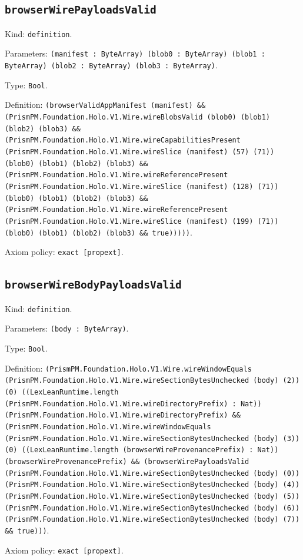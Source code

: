 \documentclass[11pt]{article}
\begin{document}
\subsection*{\texttt{browserWirePayloadsValid}}
\noindent Kind: \texttt{definition}.\par
\noindent Parameters: \texttt{(manifest : ByteArray) (blob0 : ByteArray) (blob1 : ByteArray) (blob2 : ByteArray) (blob3 : ByteArray)}.\par
\noindent Type: \texttt{Bool}.\par
\noindent Definition: \texttt{(browserValidAppManifest (manifest) \&\& (PrismPM.Foundation.Holo.V1.Wire.wireBlobsValid (blob0) (blob1) (blob2) (blob3) \&\& (PrismPM.Foundation.Holo.V1.Wire.wireCapabilitiesPresent (PrismPM.Foundation.Holo.V1.Wire.wireSlice (manifest) (57) (71)) (blob0) (blob1) (blob2) (blob3) \&\& (PrismPM.Foundation.Holo.V1.Wire.wireReferencePresent (PrismPM.Foundation.Holo.V1.Wire.wireSlice (manifest) (128) (71)) (blob0) (blob1) (blob2) (blob3) \&\& (PrismPM.Foundation.Holo.V1.Wire.wireReferencePresent (PrismPM.Foundation.Holo.V1.Wire.wireSlice (manifest) (199) (71)) (blob0) (blob1) (blob2) (blob3) \&\& true)))))}.\par
\noindent Axiom policy: \texttt{exact [propext]}.\par
\subsection*{\texttt{browserWireBodyPayloadsValid}}
\noindent Kind: \texttt{definition}.\par
\noindent Parameters: \texttt{(body : ByteArray)}.\par
\noindent Type: \texttt{Bool}.\par
\noindent Definition: \texttt{(PrismPM.Foundation.Holo.V1.Wire.wireWindowEquals (PrismPM.Foundation.Holo.V1.Wire.wireSectionBytesUnchecked (body) (2)) (0) ((LexLeanRuntime.length (PrismPM.Foundation.Holo.V1.Wire.wireDirectoryPrefix) : Nat)) (PrismPM.Foundation.Holo.V1.Wire.wireDirectoryPrefix) \&\& (PrismPM.Foundation.Holo.V1.Wire.wireWindowEquals (PrismPM.Foundation.Holo.V1.Wire.wireSectionBytesUnchecked (body) (3)) (0) ((LexLeanRuntime.length (browserWireProvenancePrefix) : Nat)) (browserWireProvenancePrefix) \&\& (browserWirePayloadsValid (PrismPM.Foundation.Holo.V1.Wire.wireSectionBytesUnchecked (body) (0)) (PrismPM.Foundation.Holo.V1.Wire.wireSectionBytesUnchecked (body) (4)) (PrismPM.Foundation.Holo.V1.Wire.wireSectionBytesUnchecked (body) (5)) (PrismPM.Foundation.Holo.V1.Wire.wireSectionBytesUnchecked (body) (6)) (PrismPM.Foundation.Holo.V1.Wire.wireSectionBytesUnchecked (body) (7)) \&\& true)))}.\par
\noindent Axiom policy: \texttt{exact [propext]}.\par
\end{document}

